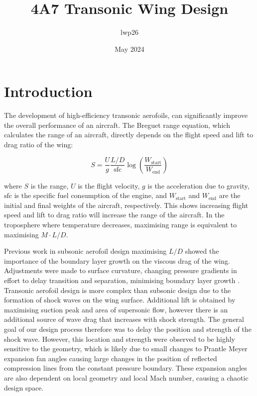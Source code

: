 \documentclass{article}
\begin{document}
\title{4A7 Transonic Wing Design}
\author{lwp26}
\date{May 2024}
\maketitle

\section{Introduction}


The development of high-efficiency transonic aerofoils, can significantly improve the overall performance of an aircraft.
The Breguet range equation, which calculates the range of an aircraft, directly depends on the flight speed and lift to drag ratio of the wing:

\begin{equation}
S = \frac{U}{g}\frac{L/D}{\text{sfc}} \log \left( \frac{W_\text{start}}{W_\text{end}} \right)
\end{equation}

where $S$ is the range, $U$ is the flight velocity, $g$ is the acceleration due to gravity, $\text{sfc}$ is the specific fuel consumption of the engine, and $W_\text{start}$ and $W_\text{end}$ are the initial and final weights of the aircraft, respectively.
This shows increasing flight speed and lift to drag ratio will increase the range of the aircraft.
In the troposphere where temperature decreases, maximising range is equivalent to maximising $M \cdot L/D$.

Previous work in subsonic aerofoil design maximising $L/D$ showed the importance of the boundary layer growth on the viscous drag of the wing.
Adjustments were made to surface curvature, changing pressure gradients in effort to delay transition and separation, minimising boundary layer growth \cite{SA1_report}.
Transonic aerofoil design is more complex than subsonic design due to the formation of shock waves on the wing surface.
Additional lift is obtained by maximising suction peak and area of supersonic flow, however there is an additional source of wave drag that increases with shock strength.
The general goal of our design process therefore was to delay the position and strength of the shock wave.
However, this location and strength were observed to be highly sensitive to the geometry, which is likely due to small changes to Prantle Meyer
expansion fan angles causing large changes in the position of reflected compression lines from the constant pressure boundary.
These expansion angles are also dependent on local geometry and local Mach number, causing a chaotic design space.
\end{document}
